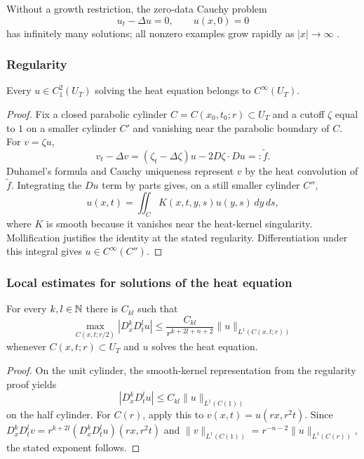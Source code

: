 \begin{remark}
\label{rem:heat-equation-nonphysical-solutions}

Without a growth restriction, the zero-data Cauchy problem
$$u_t-\Delta u=0,
\qquad
u(x,0)=0$$
has infinitely many solutions; all nonzero examples grow rapidly as
$|x|\to\infty$ \cite{John1982}.
\end{remark}

\subsubsection{Regularity}
\label{sec:heat-regularity}

\begin{theorem}[Smoothness]
\label{thm:heat-equation-smoothness}

Every $u\in C_1^2(U_T)$ solving the heat equation belongs to
$C^\infty(U_T)$.
\end{theorem}
\begin{proof}
\sketch Fix a closed parabolic cylinder $C=C(x_0,t_0;r)\subset U_T$ and a
cutoff $\zeta$ equal to $1$ on a smaller cylinder $C'$ and vanishing near the
parabolic boundary of $C$. For $v=\zeta u$,
$$v_t-\Delta v=(\zeta_t-\Delta\zeta)u-2D\zeta\cdot Du=:\widetilde f.$$
Duhamel's formula and Cauchy uniqueness represent $v$ by the heat convolution
of $\widetilde f$. Integrating the $Du$ term by parts gives, on a still smaller
cylinder $C''$,
$$u(x,t)=\iint_CK(x,t,y,s)u(y,s)\,dy\,ds,$$
where $K$ is smooth because it vanishes near the heat-kernel singularity.
Mollification justifies the identity at the stated regularity. Differentiation
under this integral gives $u\in C^\infty(C'')$.
\end{proof}

\subsubsection{Local estimates for solutions of the heat equation}
\label{sec:heat-local-estimates}

\begin{theorem}
\label{thm:heat-equation-derivative-estimates}

For every $k,l\in\mathbb{N}$ there is $C_{kl}$ such that
$$\max_{C(x,t;r/2)}|D_x^kD_t^lu|
\le\frac{C_{kl}}{r^{k+2l+n+2}}
\|u\|_{L^1(C(x,t;r))}$$
whenever $C(x,t;r)\subset U_T$ and $u$ solves the heat equation.
\end{theorem}
\begin{proof}
\sketch On the unit cylinder, the smooth-kernel representation from the
regularity proof yields
$$|D_x^kD_t^lu|\le C_{kl}\|u\|_{L^1(C(1))}$$
on the half cylinder. For $C(r)$, apply this to $v(x,t)=u(rx,r^2t)$. Since
$D_x^kD_t^lv=r^{k+2l}(D_x^kD_t^lu)(rx,r^2t)$ and
$\|v\|_{L^1(C(1))}=r^{-n-2}\|u\|_{L^1(C(r))}$, the stated exponent follows.
\end{proof}

